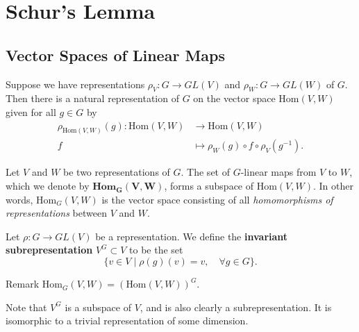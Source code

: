 \section{Schur's Lemma}
\subsection{Vector Spaces of Linear Maps}

\begin{frame}
\begin{proposition}
Suppose we have representations $\rho_V \colon G \to GL(V)$ and $\rho_W \colon G \to GL(W)$ of $G$. Then there is a natural representation of $G$ on the vector space $\text{Hom}(V,W)$ given for all $g \in G$ by
\begin{align*}		
 \rho_{\text{Hom}(V,W)}(g)  \colon \text{Hom}(V,W) &\to \text{Hom}(V,W) \\		
 f &\mapsto \rho_{W}(g) \circ f \circ \rho_{V}(g^{-1}).
 \end{align*}		
\end{proposition}		
\end{frame}

\begin{frame}
\begin{definition}		
Let $V$ and $W$ be two representations of $G$.  The set of $G$-linear maps from $V$ to $W$, which we denote by $\textbf{Hom}_\mathbf{G}\mathbf{(V,W)}$, forms a subspace of $\text{Hom}(V,W)$.  In other words, $\text{Hom}_{G}(V,W)$ is the vector space consisting of all \textit{homomorphisms of representations} between $V$ and $W$. 
\end{definition} 

\begin{definition}
Let $\rho \colon G \to GL(V)$ be a representation.  We define the \textbf{invariant subrepresentation} $V^G \subset V$ to be the set 
\[ \{ v \in V  \mid \rho(g)(v) = v,  \quad \forall g \in G \}. \]
\end{definition}

\begin{block}{Remark}
$\text{Hom}_G(V,W) = ( \text{Hom} (V,W) )^G $.
\end{block}
\end{frame}
\begin{note}
Note that $V^G$ is a subspace of $V$, and is also clearly a subrepresentation.   It is isomorphic to a trivial representation of some dimension.
\end{note}


